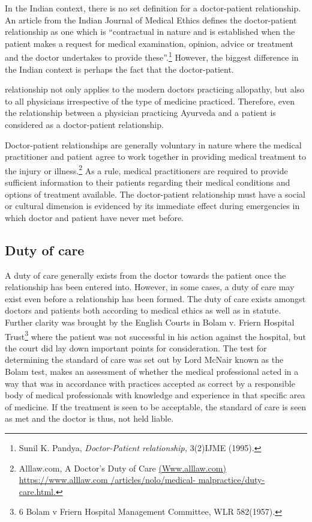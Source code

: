 \begin{multicols}{2}
\noi
In the Indian context, there is no set definition for a doctor-patient relationship. An
article from the Indian Journal of Medical Ethics defines the doctor-patient relationship
as one which is “contractual in nature and is established when the patient makes a request for medical examination, opinion, advice or treatment and the doctor undertakes to provide these”.\footnote{ Sunil K. Pandya, \textit{Doctor-Patient relationship,} 3(2)IJME (1995).} However, the biggest difference in the Indian context is perhaps the fact that the doctor-patient.

\noi
relationship not only applies to the modern doctors practicing allopathy, but also to all
physicians irrespective of the type of medicine practiced. Therefore, even the
relationship between a physician practicing Ayurveda and a patient is considered as a
doctor-patient relationship.


\noi
Doctor-patient relationships are generally voluntary in nature where the medical
practitioner and patient agree to work together in providing medical treatment to the
injury or illness.\footnote{Alllaw.com, A Doctor's Duty of Care \url{(Www.alllaw.com) https://www.alllaw.com
/articles/nolo/medical- malpractice/duty-care.html.}} As a rule, medical practitioners are required to provide sufficient
information to their patients regarding their medical conditions and options of treatment
available. The doctor-patient relationship must have a social or cultural dimension is
evidenced by its immediate effect during emergencies in which doctor and patient have
never met before.

\subsection*{Duty of care}

\noi
A duty of care generally exists from the doctor towards the patient once the relationship
has been entered into. However, in some cases, a duty of care may exist even before a
relationship has been formed. The duty of care exists amongst doctors and patients both
according to medical ethics as well as in statute. Further clarity was brought by the
English Courts in Bolam v. Friern Hospital Trust\footnote{6 Bolam v Friern Hospital Management Committee, WLR 582(1957).} where the patient was not successful
in his action against the hospital, but the court did lay down important points for
consideration. The test for determining the standard of care was set out by Lord McNair
known as the Bolam test, makes an assessment of whether the medical professional
acted in a way that was in accordance with practices accepted as correct by a
responsible body of medical professionals with knowledge and experience in that specific area of medicine. If the treatment is seen to be acceptable, the standard of care
is seen as met and the doctor is thus, not held liable.


\end{multicols}
